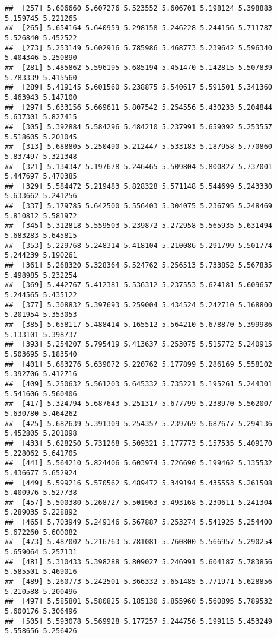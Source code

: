 \documentclass[
]{article}
\begin{document}
\begin{verbatim}
##  [257] 5.606660 5.607276 5.523552 5.606701 5.198124 5.398883 5.159745 5.221265
##  [265] 5.654164 5.640959 5.298158 5.246228 5.244156 5.711787 5.526840 5.452522
##  [273] 5.253149 5.602916 5.785986 5.468773 5.239642 5.596340 5.404346 5.250890
##  [281] 5.485862 5.596195 5.685194 5.451470 5.142815 5.507839 5.783339 5.415560
##  [289] 5.419145 5.601560 5.238875 5.540617 5.591501 5.341360 5.463943 5.147100
##  [297] 5.633156 5.669611 5.807542 5.254556 5.430233 5.204844 5.637301 5.827415
##  [305] 5.392884 5.584296 5.484210 5.237991 5.659092 5.253557 5.518605 5.201045
##  [313] 5.688805 5.250490 5.212447 5.533183 5.187958 5.770860 5.837497 5.321348
##  [321] 5.134347 5.197678 5.246465 5.509804 5.800827 5.737001 5.447697 5.470385
##  [329] 5.584472 5.219483 5.828328 5.571148 5.544699 5.243330 5.633662 5.241256
##  [337] 5.179785 5.642500 5.556403 5.304075 5.236795 5.248469 5.810812 5.581972
##  [345] 5.312818 5.559503 5.239872 5.272958 5.565935 5.631494 5.683283 5.645815
##  [353] 5.229768 5.248314 5.418104 5.210086 5.291799 5.501774 5.244239 5.190261
##  [361] 5.268320 5.328364 5.524762 5.256513 5.733852 5.567835 5.498985 5.232254
##  [369] 5.442767 5.412381 5.536312 5.237553 5.624181 5.609657 5.244565 5.435122
##  [377] 5.308832 5.397693 5.259004 5.434524 5.242710 5.168800 5.201954 5.353053
##  [385] 5.658117 5.488414 5.165512 5.564210 5.678870 5.399986 5.133101 5.398737
##  [393] 5.254207 5.795419 5.413637 5.253075 5.515772 5.240915 5.503695 5.183540
##  [401] 5.683276 5.639072 5.220762 5.177899 5.286169 5.558102 5.392706 5.412716
##  [409] 5.250632 5.561203 5.645332 5.735221 5.195261 5.244301 5.541606 5.560406
##  [417] 5.324794 5.687643 5.251317 5.677799 5.238970 5.562007 5.630780 5.464262
##  [425] 5.682639 5.391309 5.254357 5.239769 5.687677 5.294136 5.452805 5.201098
##  [433] 5.628250 5.731268 5.509321 5.177773 5.157535 5.409170 5.228062 5.641705
##  [441] 5.564210 5.824406 5.603974 5.726690 5.199462 5.135532 5.436677 5.652924
##  [449] 5.599216 5.570562 5.489472 5.349194 5.435553 5.261508 5.400976 5.527738
##  [457] 5.500380 5.268727 5.501963 5.493168 5.230611 5.241304 5.289035 5.228892
##  [465] 5.703949 5.249146 5.567887 5.253274 5.541925 5.254400 5.672260 5.600082
##  [473] 5.487002 5.216763 5.781081 5.760800 5.566957 5.290254 5.659064 5.257131
##  [481] 5.310433 5.398288 5.809027 5.246991 5.604187 5.783856 5.585501 5.469016
##  [489] 5.260773 5.242501 5.366332 5.651485 5.771971 5.628856 5.210588 5.200496
##  [497] 5.585801 5.580825 5.185130 5.855960 5.560895 5.789532 5.600176 5.306496
##  [505] 5.593078 5.569928 5.177257 5.244756 5.199115 5.453249 5.558656 5.256426

\end{verbatim}
\end{document}
